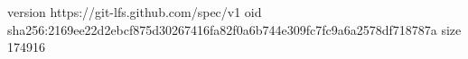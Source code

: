 version https://git-lfs.github.com/spec/v1
oid sha256:2169ee22d2ebcf875d30267416fa82f0a6b744e309fc7fc9a6a2578df718787a
size 174916
